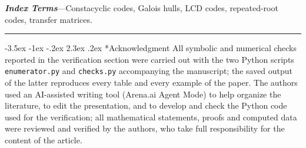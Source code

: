 \documentclass[11pt,a4paper]{article}
\makeatletter
\renewcommand\section{\@startsection{section}{1}{\z@}%
  {-3.5ex \@plus -1ex \@minus -.2ex}%
  {2.3ex \@plus .2ex}%
  {\normalfont\normalsize\scshape\centering}}
\theoremstyle{plain}
\theoremstyle{definition}
\theoremstyle{remark}
\makeatother
\begin{document}
\vspace{0.4em}
\noindent\textbf{\textit{Index Terms}}---Constacyclic codes, Galois hulls, LCD
codes, repeated-root codes, transfer matrices.

\vspace{0.4em}
\noindent\rule{\textwidth}{0.4pt}



\section*{Acknowledgment}
All symbolic and numerical checks reported in the verification section were
carried out with the two Python scripts \texttt{enumerator.py} and
\texttt{checks.py} accompanying the manuscript; the saved output of the latter
reproduces every table and every example of the paper.
The authors used an AI-assisted writing tool (Arena.ai Agent Mode) to help
organize the literature, to edit the presentation, and to develop and check the
Python code used for the verification; all mathematical statements, proofs and
computed data were reviewed and verified by the authors, who take full
responsibility for the content of the article.



\end{document}
